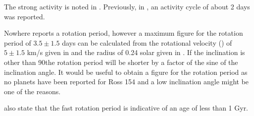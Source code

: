 The strong activity is noted in \citet{wargelin08}. Previously, in
\citet{jarrett76}, an activity cycle of about 2 days was reported.

Nowhere reports a rotation period, however a maximum figure for the rotation
period of $3.5 \pm 1.5$ days can be calculated from the rotational
velocity (\vsini) of $5 \pm 1.5$ km/s given in \citet{wargelin08} and the radius of 0.24 solar given in
\citet{johnson83}. If the inclination is other than 90\degree the rotation
period will be shorter by a factor of the sine of the inclination angle.
It would be useful to obtain a figure for the rotation period as no planets have
been reported for Ross 154 and a low inclination angle might be one of the
reasons.

\citet{wargelin08} also state that the fast rotation period is indicative of an age of less than 1 Gyr.
